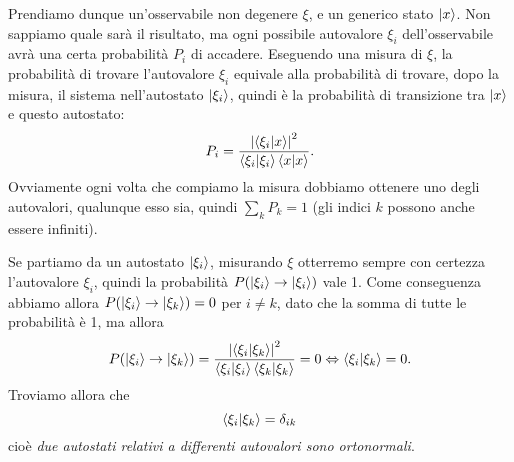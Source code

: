 Prendiamo dunque un'osservabile non degenere $\xi$, e un generico stato $\left|{x}\right\rangle$.
Non sappiamo quale sarà il risultato, ma ogni possibile autovalore $\xi_i$ dell'osservabile avrà una certa probabilità $P_i$ di accadere.
Eseguendo una misura di $\xi$, la probabilità di trovare l'autovalore $\xi_i$ equivale alla probabilità di trovare, dopo la misura, il sistema nell'autostato $\left|{\xi_i}\right\rangle$, quindi è la probabilità di transizione tra $\left|{x}\right\rangle$ e questo autostato:
\begin{equation}
	P_i=\frac{\left|{\left\langle{\xi_i}\middle|{x}\right\rangle}\right|^2}{\left\langle{\xi_i}\middle|{\xi_i}\right\rangle\left\langle{x}\middle|{x}\right\rangle}.
\end{equation}
Ovviamente ogni volta che compiamo la misura dobbiamo ottenere uno degli autovalori, qualunque esso sia, quindi $\sum_kP_k=1$ (gli indici $k$ possono anche essere infiniti).

Se partiamo da un autostato $\left|{\xi_i}\right\rangle$, misurando $\xi$ otterremo sempre con certezza l'autovalore $\xi_i$, quindi la probabilità $P(\left|{\xi_i}\right\rangle\to\left|{\xi_i}\right\rangle)$ vale 1.
Come conseguenza abbiamo allora $P(\left|{\xi_i}\right\rangle\to\left|{\xi_k}\right\rangle)=0$ per $i\neq k$, dato che la somma di tutte le probabilità è 1, ma allora
\begin{equation}
	P(\left|{\xi_i}\right\rangle\to\left|{\xi_k}\right\rangle)=\frac{\left|{\left\langle{\xi_i}\middle|{\xi_k}\right\rangle}\right|^2}{\left\langle{\xi_i}\middle|{\xi_i}\right\rangle\left\langle{\xi_k}\middle|{\xi_k}\right\rangle}=0 \Leftrightarrow \left\langle{\xi_i}\middle|{\xi_k}\right\rangle=0.
	\label{eq:autostati-ortogonali}
\end{equation}
Troviamo allora che
\begin{equation}
	\left\langle{\xi_i}\middle|{\xi_k}\right\rangle=\delta_{ik}
	\label{eq:autostati-ortonormali}
\end{equation}
cioè \emph{due autostati relativi a differenti autovalori sono ortonormali}.
